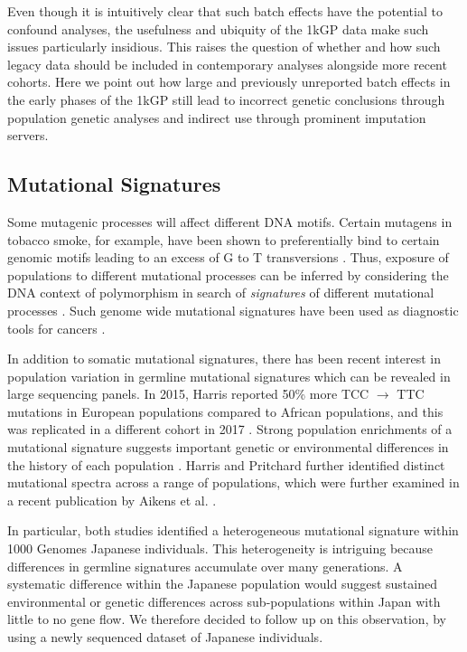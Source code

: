 \documentclass[9pt,lineno]{elife}
\begin{document}
Even though it is intuitively clear that such batch effects have the potential to confound analyses, the usefulness and ubiquity of the 1kGP data make such issues particularly insidious.   
This raises the question of whether and how such legacy data should be included in contemporary analyses alongside more recent cohorts.
Here we point out how large and previously unreported batch effects in the early phases of the 1kGP still lead to incorrect genetic conclusions through population genetic analyses and indirect use through prominent imputation servers.


\subsection{Mutational Signatures}

Some mutagenic processes will affect different DNA motifs. 
Certain mutagens in tobacco smoke, for example, have been shown to preferentially bind to certain genomic motifs leading to an excess of G to T transversions \citep{Pfeifer2002,Pleasance2010}. 
Thus, exposure of populations to different mutational processes can be inferred by considering the DNA context of polymorphism in search of \textit{signatures} of different mutational processes \citep{Alexandrov2013,Shiraishi2015a}. 
Such genome wide mutational signatures have been used as diagnostic tools for cancers \citep{Alexandrov2013,Shiraishi2015a}.

In addition to somatic mutational signatures, there has been recent interest in population variation in germline mutational signatures which can be revealed in large sequencing panels. 
In 2015, Harris reported 50\% more TCC ${\rightarrow}$ TTC mutations in European populations compared to African populations, and this was replicated in a different cohort in 2017 \citep{Harris2015a, Harris2017a, Mathieson2017a}. 
Strong population enrichments of a mutational signature suggests important genetic or environmental differences in the history of each population \citep{Harris2015a, Harris2017a}. 
Harris and Pritchard further identified distinct mutational spectra across a range of populations, which were further examined in a recent publication by Aikens et al. \citep{Harris2017a,Aikens2018}.
 
 In particular, both studies  identified a heterogeneous mutational signature within 1000 Genomes Japanese individuals.
This heterogeneity is intriguing because differences in germline signatures accumulate over many generations.
A systematic difference within the Japanese population would suggest sustained environmental or genetic differences across sub-populations within Japan with little to no gene flow.
We therefore decided to follow up on this observation, by using a newly sequenced dataset of Japanese individuals. 
\end{document}
